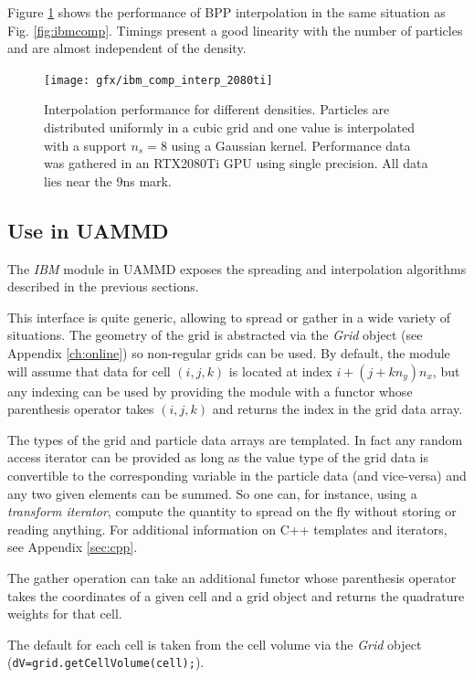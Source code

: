 \documentclass[twoside,openright,titlepage,numbers=noenddot,%
headinclude,footinclude,cleardoublepage=empty,abstract=on,
BCOR=5mm,fontsize=11pt, dvipsnames, paper=b5
]{scrreprt}
\def\ucpp{uammd_cpp_lexer.py:UAMMDCppLexer -x}
\newcommand{\uammd}{\gls{UAMMD}\xspace}
\newcommand{\gpu}{\gls{GPU}\xspace}
\begin{document}
Figure \ref{fig:ibmcompinterp} shows the performance of BPP interpolation in the same situation as Fig. \ref{fig:ibmcomp}. Timings present a good linearity with the number of particles and are almost independent of the density. 
\begin{figure}[h]
  \centering
\texttt{[image: gfx/ibm\_comp\_interp\_2080ti]}
\caption[ ]{Interpolation performance for different densities. Particles are distributed uniformly in a cubic grid and one value is interpolated with a support $n_s=8$ using a Gaussian kernel. Performance data was gathered in an RTX2080Ti \gpu using single precision. All data lies near the 9ns mark.}
  \label{fig:ibmcompinterp}
\end{figure}


\subsection*{Use in UAMMD}

The \emph{IBM} module in \uammd exposes the spreading and interpolation algorithms described in the previous sections.

This interface is quite generic, allowing to spread or gather in a wide variety of situations. The geometry of the grid is abstracted via the \emph{Grid} object (see Appendix \ref{ch:online}) so non-regular grids can be used. By default, the module will assume that data for cell $(i,j,k)$ is located at index $i+(j+kn_y)n_x$, but any indexing can be used by providing the module with a functor whose parenthesis operator takes $(i,j,k)$ and returns the index in the grid data array.

The types of the grid and particle data arrays are templated. In fact any random access iterator can be provided as long as the value type of the grid data is convertible to the corresponding variable in the particle data (and vice-versa) and any two given elements can be summed. So one can, for instance, using a \emph{transform iterator},  compute the quantity to spread on the fly without storing or reading anything. For additional information on C++ templates and iterators, see Appendix \ref{sec:cpp}.

The gather operation can take an additional functor whose parenthesis operator takes the coordinates of a given cell and a grid object and returns the quadrature weights for that cell.

The default for each cell is taken from the cell volume via the \emph{Grid} object (\texttt{dV=grid.getCellVolume(cell);}).
\end{document}

